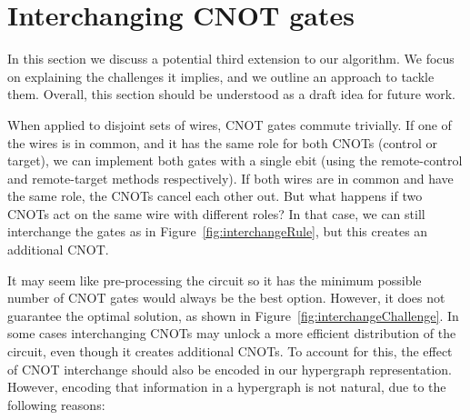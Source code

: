 

\section{Interchanging CNOT gates}
\label{Interchange}

In this section we discuss a potential third extension to our algorithm. We focus on explaining the challenges it implies, and we outline an approach to tackle them. Overall, this section should be understood as a draft idea for future work. 

When applied to disjoint sets of wires, CNOT gates commute trivially. If one of the wires is in common, and it has the same role for both CNOTs (control or target), we can implement both gates with a single ebit (using the remote-control and remote-target methods respectively). If both wires are in common and have the same role, the CNOTs cancel each other out. But what happens if two CNOTs act on the same wire with different roles? In that case, we can still interchange the gates as in Figure~\ref{fig:interchangeRule}, but this creates an additional CNOT.





It may seem like pre-processing the circuit so it has the minimum possible number of CNOT gates would always be the best option. However, it does not guarantee the optimal solution, as shown in Figure~\ref{fig:interchangeChallenge}. In some cases interchanging CNOTs may unlock a more efficient distribution of the circuit, even though it creates additional CNOTs. To account for this, the effect of CNOT interchange should also be encoded in our hypergraph representation. However, encoding that information in a hypergraph is not natural, due to the following reasons:

